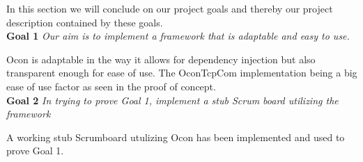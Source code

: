 \documentclass[../report.tex]{subfiles}
\begin{document}
\graphicspath{{img/}{../img/}}


In this section we will conclude on our project goals and thereby our project description contained by these goals.\\

\textbf{Goal 1} \textit{Our aim is to implement a framework that is adaptable and easy to use.}

Ocon is adaptable in the way it allows for dependency injection but also transparent enough for ease of use. The OconTcpCom implementation being a big ease of use factor as seen in the proof of concept. \\
 
\textbf{Goal 2} \textit{In trying to prove Goal 1, implement a stub Scrum board utilizing the framework}

A working stub Scrumboard utulizing Ocon has been implemented and used to prove Goal 1.
 
\end{document}
